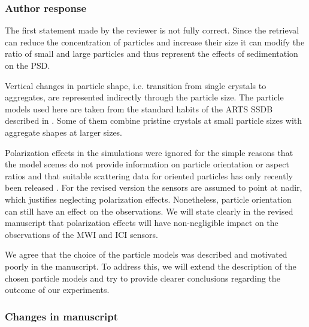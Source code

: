 \subsubsection*{Author response}

The first statement made by the reviewer is not fully correct. Since the retrieval
can reduce the concentration of particles and increase their size it can modify
the ratio of small and large particles and thus represent the effects of sedimentation
on the PSD.

Vertical changes in particle shape, i.e. transition from single crystals to
aggregates, are represented indirectly through the particle size. The particle
models used here are taken from the standard habits of the ARTS SSDB described in
\cite{eriksson18}. Some of them combine pristine crystals at small particle
sizes with aggregate shapes at larger sizes.

Polarization effects in the simulations were ignored for the simple reasons that
the model scenes do not provide information on particle orientation or aspect
ratios and that suitable scattering data for oriented particles has only
recently been released \citep{brath19}. For the revised version the sensors are
assumed to point at nadir, which justifies neglecting polarization effects.
Nonetheless, particle orientation can still have an effect on the observations.
We will state clearly in the revised manuscript that polarization effects will
have non-negligible impact on the observations of the MWI and ICI sensors.

We agree that the choice of the particle models was  described and motivated
poorly in the manuscript. To address this, we will extend the description
of the chosen particle models and  try to provide clearer conclusions regarding
the outcome of our experiments.

\subsubsection*{Changes in manuscript}

